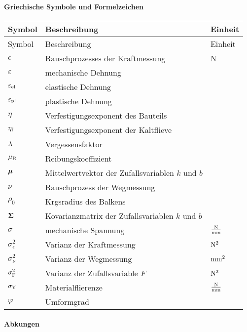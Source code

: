 \paragraph*{Griechische Symbole und Formelzeichen}
\begin{longtable}{@{}l@{\qquad}p{}@{\quad}p{18mm}}
\toprule
Symbol & Beschreibung & Einheit\\ \midrule
\endfirsthead
\toprule
Symbol & Beschreibung & Einheit\\ \midrule
\endhead
	$\epsilon$ & Rauschprozesses der Kraftmessung & N\\
	$\varepsilon$ & mechanische Dehnung & \\
	$\varepsilon_{\mathrm{el}}$ & elastische Dehnung & \\
	$\varepsilon_{\mathrm{pl}}$ & plastische Dehnung & \\
	$\eta$ & Verfestigungsexponent des Bauteils\\ 
	$\eta_{\mathrm{f}}$ & Verfestigungsexponent der Kaltflieve &\\ 
	$\lambda$ & Vergessensfaktor & \\
	$\mu_{\mathrm{R}}$ & Reibungskoeffizient & \\
	$\boldsymbol{\mu}$ & Mittelwertvektor der Zufallsvariablen $k$ und $b$ & \\
	$\nu$ & Rauschprozess der Wegmessung & \\
	$\rho_0$ & Krgsradius des Balkens & \\
	$\boldsymbol{\Sigma}$ & Kovarianzmatrix der Zufallsvariablen $k$ und $b$ & \\
	$\sigma$ & mechanische Spannung & $\frac{\mathrm{N}}{\mathrm{mm}}$\\
	$\sigma^2_\epsilon$ & Varianz der Kraftmessung & $\mathrm{N}^2$\\
	$\sigma^2_\nu$ & Varianz der Wegmessung & $\mathrm{mm}^2$\\
	$\sigma^2_{\mathrm{F}}$ & Varianz der Zufallsvariable $F$ & $\mathrm{N}^2$\\
	$\sigma_{\mathrm{Y}}$ & Materialflierenze & $\frac{\mathrm{N}}{\mathrm{mm}}$\\
	$\varphi$ & Umformgrad & \\
\end{longtable}

\newpage
\paragraph*{Abkungen}

